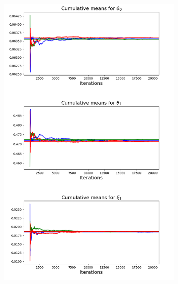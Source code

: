 \documentclass{beamer}
\begin{document}
\begin{frame}
\begin{figure}[H]
\begin{subfigure}{0.3\textwidth}
        \end{subfigure}\hfill
        \begin{subfigure}{0.32\textwidth}
            \centering
            \includegraphics[width=1.1\linewidth]{figures/vacuum_lock_reduced_convergence_plot.png}
            \label{fig:vacuum_joint_convergence_plot}
        \end{subfigure}
    

    \end{figure}
\end{frame}
\end{document}
